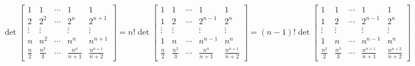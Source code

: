                 \begin{solution}
                    $\quad\det\begin{bmatrix}1&1&\cdots&1&1\\2&2^2&\cdots&2^n&2^{n+1}\\\vdots&\vdots&&\vdots&\vdots\\n&n^2&\cdots&n^n&n^{n+1}\\\frac{n}{2}&\frac{n^2}{3}&\cdots&\frac{n^n}{n+1}&\frac{n^{n+1}}{n+2}\end{bmatrix}=n!\det\begin{bmatrix}1&1&\cdots&1&1\\1&2&\cdots&2^{n-1}&2^n\\\vdots&\vdots&&\vdots&\vdots\\1&n&\cdots&n^{n-1}&n^{n}\\\frac{n}{2}&\frac{n^2}{3}&\cdots&\frac{n^n}{n+1}&\frac{n^{n+1}}{n+2}\end{bmatrix}=(n-1)!\det\begin{bmatrix}1&1&\cdots&1&1\\1&2&\cdots&2^{n-1}&2^n\\\vdots&\vdots&&\vdots&\vdots\\1&n&\cdots&n^{n-1}&n^{n}\\\frac{n^2}{2}&\frac{n^3}{3}&\cdots&\frac{n^{n+1}}{n+1}&\frac{n^{n+2}}{n+2}\end{bmatrix}$


\end{solution}
